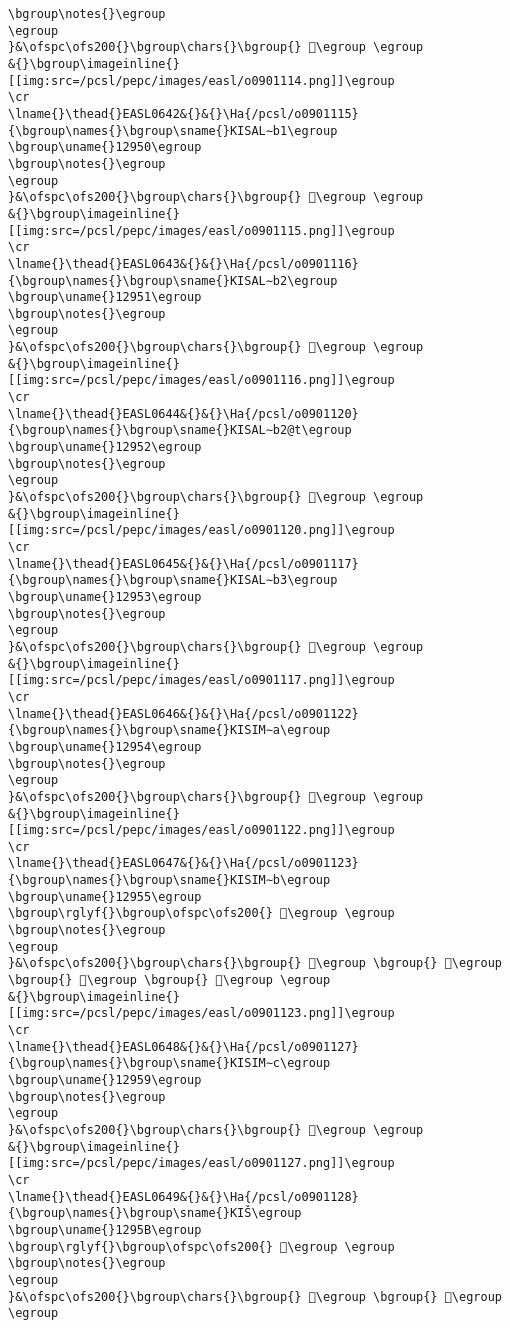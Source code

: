 \begin{verbatim}
\bgroup\notes{}\egroup
\egroup
}&\ofspc\ofs200{}\bgroup\chars{}\bgroup{} 𒥏\egroup \egroup
&{}\bgroup\imageinline{}[[img:src=/pcsl/pepc/images/easl/o0901114.png]]\egroup
\cr
\lname{}\thead{}EASL0642&{}&{}\Ha{/pcsl/o0901115}{\bgroup\names{}\bgroup\sname{}KISAL∼b1\egroup
\bgroup\uname{}12950\egroup
\bgroup\notes{}\egroup
\egroup
}&\ofspc\ofs200{}\bgroup\chars{}\bgroup{} 𒥐\egroup \egroup
&{}\bgroup\imageinline{}[[img:src=/pcsl/pepc/images/easl/o0901115.png]]\egroup
\cr
\lname{}\thead{}EASL0643&{}&{}\Ha{/pcsl/o0901116}{\bgroup\names{}\bgroup\sname{}KISAL∼b2\egroup
\bgroup\uname{}12951\egroup
\bgroup\notes{}\egroup
\egroup
}&\ofspc\ofs200{}\bgroup\chars{}\bgroup{} 𒥑\egroup \egroup
&{}\bgroup\imageinline{}[[img:src=/pcsl/pepc/images/easl/o0901116.png]]\egroup
\cr
\lname{}\thead{}EASL0644&{}&{}\Ha{/pcsl/o0901120}{\bgroup\names{}\bgroup\sname{}KISAL∼b2@t\egroup
\bgroup\uname{}12952\egroup
\bgroup\notes{}\egroup
\egroup
}&\ofspc\ofs200{}\bgroup\chars{}\bgroup{} 𒥒\egroup \egroup
&{}\bgroup\imageinline{}[[img:src=/pcsl/pepc/images/easl/o0901120.png]]\egroup
\cr
\lname{}\thead{}EASL0645&{}&{}\Ha{/pcsl/o0901117}{\bgroup\names{}\bgroup\sname{}KISAL∼b3\egroup
\bgroup\uname{}12953\egroup
\bgroup\notes{}\egroup
\egroup
}&\ofspc\ofs200{}\bgroup\chars{}\bgroup{} 𒥓\egroup \egroup
&{}\bgroup\imageinline{}[[img:src=/pcsl/pepc/images/easl/o0901117.png]]\egroup
\cr
\lname{}\thead{}EASL0646&{}&{}\Ha{/pcsl/o0901122}{\bgroup\names{}\bgroup\sname{}KISIM∼a\egroup
\bgroup\uname{}12954\egroup
\bgroup\notes{}\egroup
\egroup
}&\ofspc\ofs200{}\bgroup\chars{}\bgroup{} 𒥔\egroup \egroup
&{}\bgroup\imageinline{}[[img:src=/pcsl/pepc/images/easl/o0901122.png]]\egroup
\cr
\lname{}\thead{}EASL0647&{}&{}\Ha{/pcsl/o0901123}{\bgroup\names{}\bgroup\sname{}KISIM∼b\egroup
\bgroup\uname{}12955\egroup
\bgroup\rglyf{}\bgroup\ofspc\ofs200{} 𒥕\egroup \egroup
\bgroup\notes{}\egroup
\egroup
}&\ofspc\ofs200{}\bgroup\chars{}\bgroup{} 𒥕\egroup \bgroup{} 𒥖\egroup \bgroup{} 𒥗\egroup \bgroup{} 𒥘\egroup \egroup
&{}\bgroup\imageinline{}[[img:src=/pcsl/pepc/images/easl/o0901123.png]]\egroup
\cr
\lname{}\thead{}EASL0648&{}&{}\Ha{/pcsl/o0901127}{\bgroup\names{}\bgroup\sname{}KISIM∼c\egroup
\bgroup\uname{}12959\egroup
\bgroup\notes{}\egroup
\egroup
}&\ofspc\ofs200{}\bgroup\chars{}\bgroup{} 𒥙\egroup \egroup
&{}\bgroup\imageinline{}[[img:src=/pcsl/pepc/images/easl/o0901127.png]]\egroup
\cr
\lname{}\thead{}EASL0649&{}&{}\Ha{/pcsl/o0901128}{\bgroup\names{}\bgroup\sname{}KIŠ\egroup
\bgroup\uname{}1295B\egroup
\bgroup\rglyf{}\bgroup\ofspc\ofs200{} 𒥛\egroup \egroup
\bgroup\notes{}\egroup
\egroup
}&\ofspc\ofs200{}\bgroup\chars{}\bgroup{} 𒥚\egroup \bgroup{} 𒥛\egroup \egroup

\end{verbatim}

